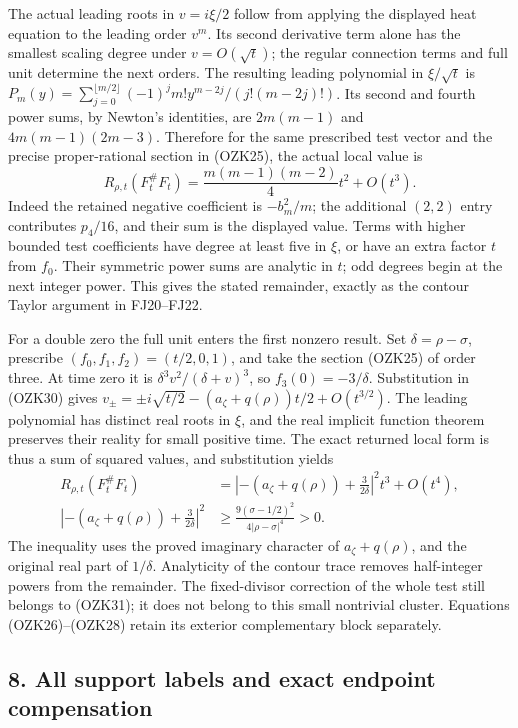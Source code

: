 \documentclass[
  10pt,
  a4paper,
]{article}
\begin{document}
The actual leading roots in \(v=i\xi/2\) follow from applying the
displayed heat equation to the leading order \(v^m\). Its second
derivative term alone has the smallest scaling degree under
\(v=O(\sqrt t)\); the regular connection terms and full unit determine
the next orders. The resulting leading polynomial in \(\xi/\sqrt t\) is
\(P_m(y)=\sum_{j=0}^{\lfloor m/2\rfloor}(-1)^jm!y^{m-2j}/(j!(m-2j)!)\).
Its second and fourth power sums, by Newton's identities, are
\(2m(m-1)\) and \(4m(m-1)(2m-3)\). Therefore for the same prescribed
test vector and the precise proper-rational section in (OZK25), the
actual local value is \[
R_{\rho,t}(F_t^\#F_t)
=\frac{m(m-1)(m-2)}4t^2+O(t^3).
\tag{OZK34}
\] Indeed the retained negative coefficient is \(-b_m^2/m\); the
additional \((2,2)\) entry contributes \(p_4/16\), and their sum is the
displayed value. Terms with higher bounded test coefficients have degree
at least five in \(\xi\), or have an extra factor \(t\) from \(f_0\).
Their symmetric power sums are analytic in \(t\); odd degrees begin at
the next integer power. This gives the stated remainder, exactly as the
contour Taylor argument in FJ20--FJ22.

For a double zero the full unit enters the first nonzero result. Set
\(\delta=\rho-\sigma\), prescribe \((f_0,f_1,f_2)=(t/2,0,1)\), and take
the section (OZK25) of order three. At time zero it is
\(\delta^3v^2/(\delta+v)^3\), so \(f_3(0)=-3/\delta\). Substitution in
(OZK30) gives \(v_\pm=\pm i\sqrt{t/2}-(a_\zeta+q(\rho))t/2+O(t^{3/2})\).
The leading polynomial has distinct real roots in \(\xi\), and the real
implicit function theorem preserves their reality for small positive
time. The exact returned local form is thus a sum of squared values, and
substitution yields \[
\begin{aligned}
R_{\rho,t}(F_t^\#F_t)
&=\left|-(a_\zeta+q(\rho))+\frac3{2\delta}\right|^2t^3+O(t^4),\\
\left|-(a_\zeta+q(\rho))+\frac3{2\delta}\right|^2
&\ge\frac{9(\sigma-1/2)^2}{4|\rho-\sigma|^4}>0.
\end{aligned}\tag{OZK35}
\] The inequality uses the proved imaginary character of
\(a_\zeta+q(\rho)\), and the original real part of \(1/\delta\).
Analyticity of the contour trace removes half-integer powers from the
remainder. The fixed-divisor correction of the whole test still belongs
to (OZK31); it does not belong to this small nontrivial cluster.
Equations (OZK26)--(OZK28) retain its exterior complementary block
separately.

\subsection{8. All support labels and exact endpoint
compensation}\label{all-support-labels-and-exact-endpoint-compensation}
\end{document}
